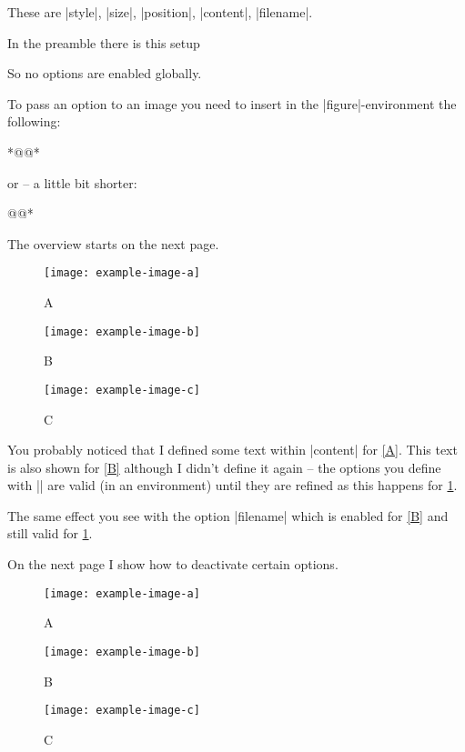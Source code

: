 \documentclass[a4paper,
10pt,
english
]{ltxdoc}
\begin{document}
These are |style|, |size|, |position|, |content|, |filename|.

In the preamble there is this setup
\begin{code}
\usepackage{draftfigure}
\end{code}
So no options are enabled globally.

To pass an option to an image you need to insert in the |figure|-environment the following:
\begin{code}
*@@*
\end{code}
or -- a little bit shorter:
\begin{code}
\setdf*@@*
\end{code}

The overview starts on the next page.
\clearpage 
{}
\begin{codeexample}
\begin{figure}[H]
 \centering
  \texttt{[image: example-image-a]}
  \caption{A}\label{A}
  \texttt{[image: example-image-b]}
  \caption{B}\label{B}
  \texttt{[image: example-image-c]}
  \caption{C}\label{C}
\end{figure}
\end{codeexample}
You probably noticed that I defined some text within |content| for \cref{A}.
This text is also shown for \cref{B} although I didn’t define it again --
the options you define with ||
are valid (in an environment) until they are refined 
as this happens for \cref{C}.

The same effect you see with the option |filename| which is enabled for \cref{B} and still valid for \cref{C}.

On the next page I show how to deactivate certain options.
\clearpage
\begin{codeexample}
\begin{figure}[H]
 \centering
  \texttt{[image: example-image-a]}
  \caption{A}\label{A1}
 
  \texttt{[image: example-image-b]}
  \caption{B}\label{B1}

  \texttt{[image: example-image-c]}
  \caption{C}\label{C1}
\end{figure}
\end{codeexample}
\end{document}
